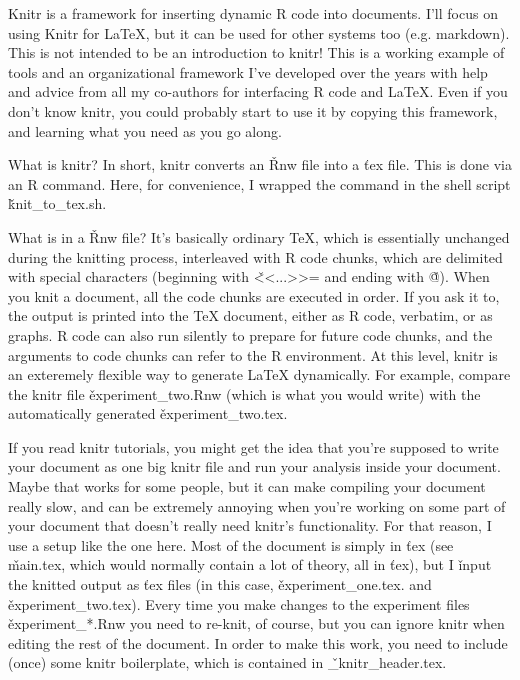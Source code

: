 Knitr is a framework for inserting dynamic R code into documents.  I'll focus on
using Knitr for LaTeX, but it can be used for other systems too (e.g. markdown).
This is not intended to be an introduction to knitr!  This is a working example
of tools and an organizational framework I've developed over the years with help
and advice from all my co-authors for interfacing R code and LaTeX.  Even if you
don't know knitr, you could probably start to use it by copying this framework,
and learning what you need as you go along.

What is knitr?  In short, knitr converts an \v{Rnw} file into a \v{tex} file.
This is done via an R command.  Here, for convenience, I wrapped the command in
the shell script \v{knit\_to\_tex.sh}.

What is in a \v{Rnw} file?  It's basically ordinary TeX, which is essentially
unchanged during the knitting process, interleaved with R code chunks, which are
delimited with special characters (beginning with \v{<<...>>=} and ending with
\v{@}).  When you knit a document, all the code chunks are executed in order. If
you ask it to, the output is printed into the TeX document, either as R code,
verbatim, or as graphs.  R code can also run silently to prepare for future code
chunks, and the arguments to code chunks can refer to the R environment.  At
this level, knitr is an exteremely flexible way to generate LaTeX dynamically.
For example, compare the knitr file \v{experiment\_two.Rnw} (which is what you
would write) with the automatically generated \v{experiment\_two.tex}.

If you read knitr tutorials, you might get the idea that you're supposed to
write your document as one big knitr file and run your analysis inside your
document.  Maybe that works for some people, but it can make compiling your
document really slow, and can be extremely annoying when you're working on some
part of your document that doesn't really need knitr's functionality. For that
reason, I use a setup like the one here.  Most of the document is simply in
\v{tex} (see \v{main.tex}, which would normally contain a lot of theory, all in
\v{tex}), but I \v{input} the knitted output as \v{tex} files (in this case,
 \v{experiment\_one.tex}. and  \v{experiment\_two.tex}).  Every time you make
 changes to the experiment files \v{experiment\_*.Rnw} you need to re-knit,
 of course, but you can ignore knitr when editing the rest of the document.
 In order to make this work, you need to include (once) some knitr boilerplate,
 which is contained in \v{\_knitr\_header.tex}.

